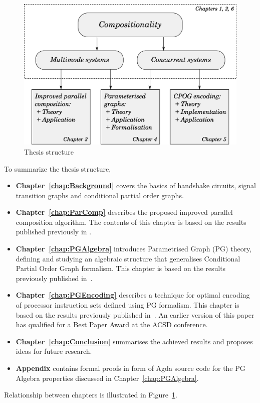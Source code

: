 \begin{figure}
\centering
   \includegraphics[scale=0.5]{fig/thesis}
   \caption{
     \label{fig:thesis_structure}
     Thesis structure}
\end{figure}

To summarize the thesis structure,

\begin{itemize}
\item
\textbf{Chapter~\ref{chap:Background}} covers the basics of handshake circuits, signal transition graphs and conditional partial order graphs.

\item
\textbf{Chapter~\ref{chap:ParComp}} describes the proposed improved parallel composition algorithm. The contents of this chapter is based on the results published previously in \cite{improved_par_comp}.

\item
\textbf{Chapter~\ref{chap:PGAlgebra}} introduces Parametrised Graph (PG) theory, defining and studying an algebraic structure that generalises Conditional Partial Order Graph formalism. This chapter is based on the results previously published in~\cite{pg_algebra}.

\item
\textbf{Chapter~\ref{chap:PGEncoding}} describes a technique for optimal encoding of processor instruction sets defined using PG formalism. This chapter is based on the results previously published in~\cite{cpog_encoding}. An earlier version of this paper has qualified for a Best Paper Award at the ACSD conference.

\item
\textbf{Chapter~\ref{chap:Conclusion}} summarises the achieved results and proposes ideas for future research.

\item
\textbf{Appendix} contains formal proofs in form of Agda source code for the PG Algebra properties discussed in Chapter~\ref{chap:PGAlgebra}.

\end{itemize}

Relationship between chapters is illustrated in Figure~\ref{fig:thesis_structure}.


